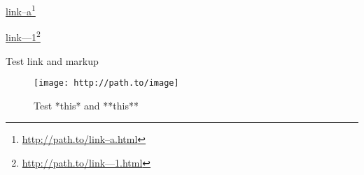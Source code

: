 \href{http://path.to/link--a.html}{link--a}\footnote{\href{http://path.to/link--a.html}{http:\slash \slash path.to\slash link--a.html}}

\href{http://path.to/link---1.html}{link---1}\footnote{\href{http://path.to/link---1.html}{http:\slash \slash path.to\slash link---1.html}}

Test link and markup \begin{figure}[htbp]
\centering
\texttt{[image: http://path.to/image]}
\caption{Test *this* and **this**}
\label{image-attr}
\end{figure}





